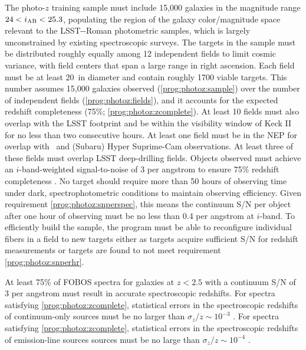 \documentclass[11pt,a4paper,twoside,onecolumn,openany,final,oldfontcommands]{memoir}
\def\DanM#1{\noindent{\textcolor{lblue}{\textbf[$\spadesuit$ #1]}}}
\begin{document}
\begin{programrequirement}
\reqitem The photo-$z$ training sample must include 15,000 galaxies in the magnitude range $24 < i_{\rm AB} < 25.3$, populating the region of the galaxy color/magnitude space relevant to the LSST-\euclid-Roman photometric samples, which is largely unconstrained by existing spectroscopic surveys. \label{prog:photoz:sample}
\reqitem The targets in the sample must be distributed roughly equally among 12 independent fields to limit cosmic variance, with field centers that span a large range in right ascension. \label{prog:photoz:fields}
\reqitem Each field must be at least 20\arcmin\ in diameter and contain roughly 1700 viable targets.  This number assumes 15,000 galaxies observed (\ref{prog:photoz:sample}) over the number of independent fields (\ref{prog:photoz:fields}), and it accounts for the expected redshift completeness (75\%; \ref{prog:photoz:zcomplete}).
\reqitem At least 10 fields must also overlap with the LSST footprint and be within the visibility window of Keck II for no less than two consecutive hours.
\reqitem At least one field must be in the NEP for overlap with \euclid\ and (Subaru) Hyper Suprime-Cam observations.
\reqitem At least three of these fields must overlap LSST deep-drilling fields.
\reqitem Objects observed must achieve an $i$-band-weighted signal-to-noise of 3 per angstrom  to ensure 75\% redshift completeness . \label{prog:photoz:snperspec}
\reqitem No target should require more than 50 hours of observing time under dark, spectrophotometric conditions to maintain observing efficiency.  Given requirement \ref{prog:photoz:snperspec}, this means the continuum S/N per object after one hour of observing must be no less than 0.4 per angstrom at $i$-band. \DanM{check this acheives S/N=3 at i=25.3 after 50h} \label{prog:photoz:snperhr}
\reqitem To efficiently build the sample, the program must be able to reconfigure individual fibers in a field to new targets either as targets acquire sufficient S/N for redshift measurements or targets are found to not meet requirement \ref{prog:photoz:snperhr}.
\end{programrequirement}

\begin{sciencerequirement}
\reqitem At least 75\% of FOBOS spectra for galaxies at $z<2.5$ with a continuum S/N of 3 per angstrom must result in accurate spectroscopic redshifts. \label{prog:photoz:zcomplete}
\reqitem For spectra satisfying \ref{prog:photoz:zcomplete}, statistical errors in the spectroscopic redshifts of continuum-only sources must be no larger than $\sigma_z/z \sim 10^{-3}$ .
\reqitem For spectra satisfying \ref{prog:photoz:zcomplete}, statistical errors in the spectroscopic redshifts of emission-line sources sources must be no large than $\sigma_z/z \sim 10^{-4}$ .
\end{sciencerequirement}
\end{document}

